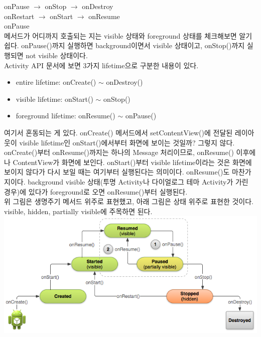 onPause $\rightarrow$ onStop $\rightarrow$ onDestroy\\

onRestart $\rightarrow$ onStart $\rightarrow$ onResume\\

onPause
\\

메서드가 어디까지 호출되는 지는 visible 상태와 foreground 상태를 체크해보면 알기 쉽다.
onPause()까지 실행하면 background이면서 visible 상태이고, onStop()까지 실행되면 not visible 상태이다.\\

Activity API 문서에 보면 3가지 lifetime으로 구분한 내용이 있다.
\begin{itemize}
\item entire lifetime: onCreate() $\sim$
 onDestroy()
\item visible lifetime: onStart() $\sim$
 onStop()
\item foreground lifetime: onResume() $\sim$
 onPause()
\end{itemize}
여기서 혼동되는 게 있다. onCreate() 메서드에서 setContentView()에 전달된 레이아웃이 visible lifetime인 onStart()에서부터 화면에 보이는 것일까? 그렇지 않다. 
onCreate()부터 onResume()까지는 하나의 Message 처리이므로, onResume() 이후에나 ContentView가 화면에 보인다.
onStart()부터 visible lifetime이라는 것은 화면에 보이지 않다가 다시 보일 때는 여기부터 실행된다는 의미이다.
onResume()도 마찬가지이다. background visible 상태(투명 Activity나 다이얼로그 테마 Activity가 가린 경우)에 있다가 foreground로 오면 onResume()부터 실행된다.\\

위 그림은 생명주기 메서드 위주로 표현했고, 아래 그림은 상태 위주로 표현한 것이다. visible, hidden, partially visible에 주목하면 된다.\\
\includegraphics[scale=0.5]{basic-lifecycle-paused}

